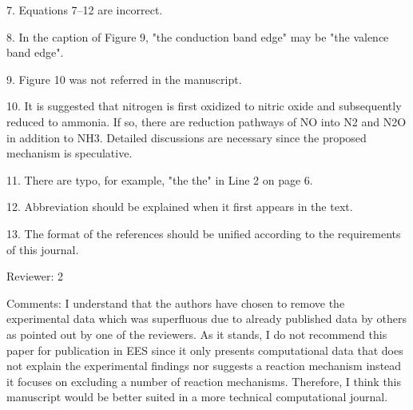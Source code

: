


7. Equations 7–12 are incorrect.


8. In the caption of Figure 9, "the conduction band edge" may be "the valence band edge".


9. Figure 10 was not referred in the manuscript.


10. It is suggested that nitrogen is first oxidized to nitric oxide and subsequently reduced to ammonia. If so, there are reduction pathways of NO into N2 and N2O in addition to NH3. Detailed discussions are necessary since the proposed mechanism is speculative.

11. There are typo, for example, "the the" in Line 2 on page 6.


12. Abbreviation should be explained when it first appears in the text.

13. The format of the references should be unified according to the requirements of this journal.

Reviewer: 2

Comments:
I understand that the authors have chosen to remove the experimental data which was superfluous due to already published data by others as pointed out by one of the reviewers. As it stands, I do not recommend this paper for publication in EES since it only presents computational data that does not explain the experimental findings nor suggests a reaction mechanism instead it focuses on excluding a number of reaction mechanisms. Therefore, I think this manuscript would be better suited in a more technical computational journal.

